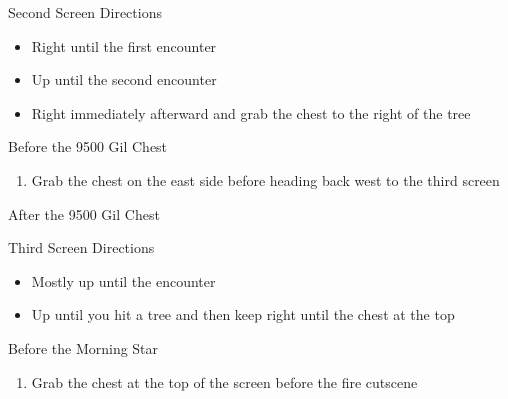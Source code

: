 \begin{paracol}{2}
\switchcolumn*
\begin{misc}{Second Screen Directions}
    \begin{itemize}
        \item Right until the first encounter
        \item Up until the second encounter 
        \item Right immediately afterward and grab the chest to the right of the tree
    \end{itemize}
\end{misc}

\switchcolumn
\begin{steproute}{Before the 9500 Gil Chest}
\end{steproute}

\switchcolumn
\begin{enumerate}[resume]
    \item Grab the  chest on the east side before heading back west to the third screen
\end{enumerate}

\switchcolumn
\begin{steproute}{After the 9500 Gil Chest}
\end{steproute}

\switchcolumn*
\begin{misc}{Third Screen Directions}
    \begin{itemize}
        \item Mostly up until the encounter
        \item Up until you hit a tree and then keep right until the chest at the top
    \end{itemize}
\end{misc}

\switchcolumn
\begin{steproute}{Before the Morning Star}
\end{steproute}

\switchcolumn
\begin{enumerate}[resume]
    \item Grab the  chest at the top of the screen before the fire cutscene
\end{enumerate}


\end{paracol}

